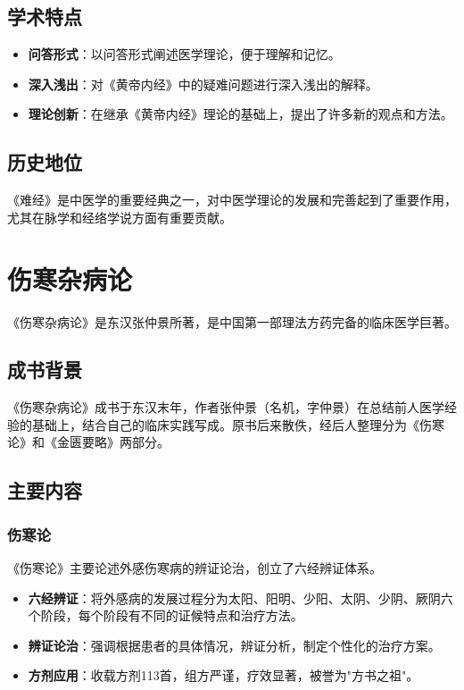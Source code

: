 \documentclass[12pt,UTF8]{ctexbook}
\begin{document}
\subsection{学术特点}

\begin{itemize}
\item \textbf{问答形式}：以问答形式阐述医学理论，便于理解和记忆。
\item \textbf{深入浅出}：对《黄帝内经》中的疑难问题进行深入浅出的解释。
\item \textbf{理论创新}：在继承《黄帝内经》理论的基础上，提出了许多新的观点和方法。
\end{itemize}

\subsection{历史地位}

《难经》是中医学的重要经典之一，对中医学理论的发展和完善起到了重要作用，尤其在脉学和经络学说方面有重要贡献。

\section{伤寒杂病论}

《伤寒杂病论》是东汉张仲景所著，是中国第一部理法方药完备的临床医学巨著。

\subsection{成书背景}

《伤寒杂病论》成书于东汉末年，作者张仲景（名机，字仲景）在总结前人医学经验的基础上，结合自己的临床实践写成。原书后来散佚，经后人整理分为《伤寒论》和《金匮要略》两部分。

\subsection{主要内容}

\subsubsection{伤寒论}

《伤寒论》主要论述外感伤寒病的辨证论治，创立了六经辨证体系。

\begin{itemize}
\item \textbf{六经辨证}：将外感病的发展过程分为太阳、阳明、少阳、太阴、少阴、厥阴六个阶段，每个阶段有不同的证候特点和治疗方法。
\item \textbf{辨证论治}：强调根据患者的具体情况，辨证分析，制定个性化的治疗方案。
\item \textbf{方剂应用}：收载方剂113首，组方严谨，疗效显著，被誉为"方书之祖"。
\end{itemize}
\end{document}
